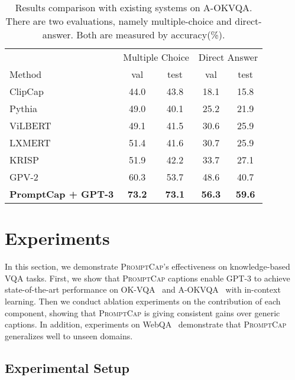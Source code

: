\documentclass[10pt,twocolumn,letterpaper]{article}
\newcommand{\NAME}{\textsc{PromptCap}\xspace}
\begin{document}
\begin{table*}[h]
\end{table*} \begin{table}[h]
\small
\centering
\caption{\label{tab:aokvqa}
Results comparison with existing systems on A-OKVQA. There are two evaluations, namely multiple-choice and direct-answer. Both are measured by accuracy(\%).
}
\begin{tabular}{lcc|cc}
\toprule[1.2pt]
& \multicolumn{2}{c}{Multiple Choice} & \multicolumn{2}{c}{Direct Answer} \\
Method & val & test & val & test \\
\midrule
ClipCap \cite{schwenk2022aokvqa}  & 44.0 & 43.8  & 18.1 & 15.8 \\
Pythia \cite{jiang2018pythia} & 49.0 & 40.1  & 25.2  & 21.9 \\
ViLBERT \cite{lu2019vilbert} & 49.1 & 41.5  &  30.6  &  25.9 \\
LXMERT \cite{Tan2019LXMERTLC}  &  51.4  & 41.6 & 30.7  & 25.9 \\
KRISP \cite{marino2021krisp}  &  51.9  & 42.2  & 33.7  &  27.1 \\
GPV-2 \cite{kamath2022webly}  &  60.3  &  53.7  & 48.6  & 40.7 \\
\midrule
\textbf{PromptCap + GPT-3} & \textbf{73.2} & \textbf{73.1} & \textbf{56.3}  & \textbf{59.6}\\
\bottomrule[1.2pt]
\end{tabular}

\vspace{-3mm}
\end{table} 

\section{Experiments}
\label{sec:experiment}

In this section, we demonstrate \NAME's effectiveness on knowledge-based VQA tasks.
First, we show that \NAME captions enable GPT-3 to achieve state-of-the-art performance on OK-VQA~\cite{marino2019okvqa} and A-OKVQA~\cite{schwenk2022aokvqa} with in-context learning.
Then we conduct ablation experiments on the contribution of each component, showing that \NAME is giving consistent gains over generic captions.
In addition, experiments on WebQA~\cite{chang2022webqa} demonstrate that \NAME generalizes well to unseen domains.

\subsection{Experimental Setup}
\label{sec:results:setup}
\end{document}
